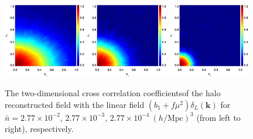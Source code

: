 \documentclass[aps,prx,twocolumn,superscriptaddress,groupedaddress,nofootinbib,amsfont]{revtex4}  %
\newcommand{\mr}{\mathrm}
\newcommand{\bmk}{\bm{k}}
\begin{document}
\begin{figure}[tbp]
\vspace{-0.3cm}
\begin{center}
\includegraphics[width=0.32\textwidth]{0.000anixcc_deltaRsxLs-0_31.eps}
\includegraphics[width=0.32\textwidth]{0.000anixcc_deltaRsxLs-1_31.eps}
\includegraphics[width=0.32\textwidth]{0.000anixcc_deltaRsxLs-2_31.eps}
\end{center}
\vspace{-0.7cm}
\caption{The two-dimensional cross correlation coefficientsof the halo 
reconstructed field with the linear field $(b_1+f\mu^2)\delta_L(\bmk)$ for
$\bar{n}=2.77\times10^{-2}$, $2.77\times10^{-3}$, $2.77\times10^{-4}\ (h/\mr{Mpc})^3$ (from left to right), respectively.}
\label{fig:xcc_ha}
\end{figure}



\end{document}
